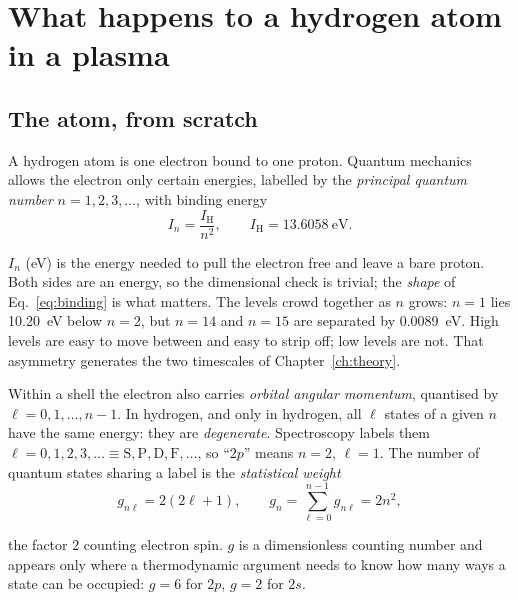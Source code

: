 \section{What happens to a hydrogen atom in a plasma}
\label{sec:atom_processes}

\subsection{The atom, from scratch}

A hydrogen atom is one electron bound to one proton. Quantum mechanics allows
the electron only certain energies, labelled by the \emph{principal quantum
number} $n = 1,2,3,\dots$, with binding energy
\begin{equation}
  I_n = \frac{I_{\mathrm H}}{n^{2}},
  \qquad I_{\mathrm H} = \SI{13.6058}{\electronvolt}.
  \label{eq:binding}
\end{equation}

\noindent $I_n$ (\si{\electronvolt}) is the energy needed to pull the electron
free and leave a bare proton. Both sides are an energy, so the dimensional check
is trivial; the \emph{shape} of Eq.~\eqref{eq:binding} is what matters. The
levels crowd together as $n$ grows: $n=1$ lies \SI{10.20}{\electronvolt} below
$n=2$, but $n=14$ and $n=15$ are separated by \SI{0.0089}{\electronvolt}. High
levels are easy to move between and easy to strip off; low levels are not. That
asymmetry generates the two timescales of Chapter~\ref{ch:theory}.

Within a shell the electron also carries \emph{orbital angular momentum},
quantised by $\ell = 0,1,\dots,n-1$. In hydrogen, and only in hydrogen, all
$\ell$ states of a given $n$ have the same energy: they are \emph{degenerate}.
Spectroscopy labels them $\ell = 0,1,2,3,\dots \equiv
\mathrm{S},\mathrm{P},\mathrm{D},\mathrm{F},\dots$, so ``$2p$'' means $n=2$,
$\ell=1$. The number of quantum states sharing a label is the
\emph{statistical weight}
\begin{equation}
  g_{n\ell} = 2(2\ell+1),
  \qquad g_n = \sum_{\ell=0}^{n-1} g_{n\ell} = 2n^{2},
  \label{eq:weights}
\end{equation}

\noindent the factor 2 counting electron spin. $g$ is a dimensionless counting
number and appears only where a thermodynamic argument needs to know how many
ways a state can be occupied: $g = 6$ for $2p$, $g = 2$ for $2s$.

